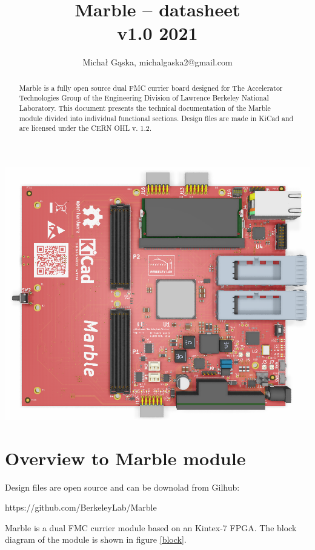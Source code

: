 \documentclass[12pt,oneside,a4]{article}
\title{Marble -- datasheet\\ \small{v1.0 2021}}
\author{Michał Gąska, michalgaska2@gmail.com}
\begin{document}
\maketitle
\begin{center}
\includegraphics[width=0.8\linewidth]{marble_top.png}
\end{center}
\begin{abstract}
Marble is a fully open source dual FMC currier board designed for The Accelerator Technologies Group of the Engineering Division of Lawrence Berkeley National Laboratory. This document presents the technical documentation of the Marble module divided into individual functional sections.
Design files are made in KiCad and are licensed under the CERN OHL v. 1.2.
\end{abstract}

\clearpage
\tableofcontents

\clearpage

\section{Overview to Marble module}

\begin{leftbar}
Design files are open source and can be downolad from Gilhub:

https://github.com/BerkeleyLab/Marble
\end{leftbar}

Marble is a dual FMC currier module based on an Kintex-7 FPGA. The block diagram of the module is shown in figure \ref{block}.
\end{document}
